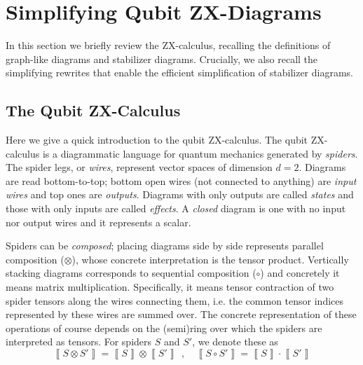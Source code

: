 \section{Simplifying Qubit ZX-Diagrams}

In this section we briefly review the ZX-calculus, recalling the definitions of graph-like diagrams and stabilizer diagrams.
Crucially, we also recall the simplifying rewrites that enable the efficient
simplification of stabilizer diagrams.

\subsection{The Qubit ZX-Calculus}

Here we give a quick introduction to the qubit ZX-calculus.
The qubit ZX-calculus is a diagrammatic language for quantum mechanics generated by \emph{spiders}.
The spider legs, or \emph{wires}, represent vector spaces of dimension $d=2$.
Diagrams are read bottom-to-top; bottom open wires (not connected to anything) are \emph{input wires} and top ones are \emph{outputs}.
Diagrams with only outputs are called \emph{states} and those with only inputs are called \emph{effects}.
A \emph{closed} diagram is one with no input nor output wires
and it represents a scalar.

Spiders can be \emph{composed};
placing diagrams side by side represents parallel composition ($\otimes$),
whose concrete interpretation is the tensor product.
Vertically stacking diagrams corresponds to sequential composition ($\circ$) and concretely it means matrix multiplication.
Specifically, it means tensor contraction of two spider tensors along the wires connecting them, i.e. the common tensor indices represented by these wires are summed over.
The concrete representation of these operations of course depends on the (semi)ring over which the spiders are interpreted as tensors.
For spiders $S$ and $S'$, we denote these as
\begin{equation}
\left\llbracket S \otimes S' \right\rrbracket = \left\llbracket S \right\rrbracket \otimes \left\llbracket S' \right\rrbracket ~~,\quad
	\left\llbracket S \circ S' \right\rrbracket = \left\llbracket S \right\rrbracket \cdot \left\llbracket S' \right\rrbracket 
\end{equation} 


